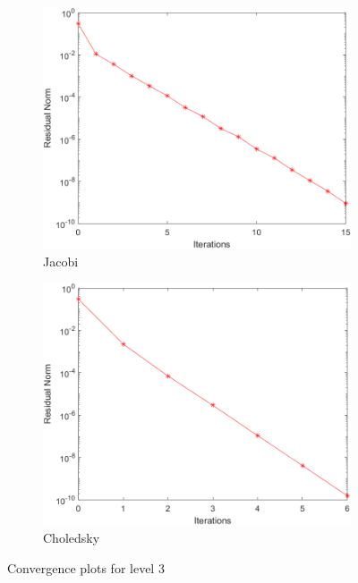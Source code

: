 \documentclass[a4paper, 11pt]{article}
\begin{document}
				\begin{figure}[H]
					\begin{subfigure}{.49\textwidth}
						\centering
						\includegraphics[width=.99\linewidth]{img3/J.png}  
						\caption{Jacobi}
						\label{fig:Jacobi_3}
					\end{subfigure}
					\begin{subfigure}{.49\textwidth}
						\centering
						\includegraphics[width=.99\linewidth]{img3/C.png}  
						\caption{Choledsky}
						\label{fig:Chol_3}
					\end{subfigure}
					\caption{Convergence plots for level 3}
					\label{fig:fig3}
				\end{figure}
			
\end{document}
